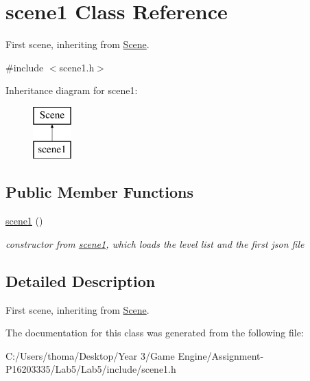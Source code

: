 \hypertarget{classscene1}{}\section{scene1 Class Reference}
\label{classscene1}


First scene, inheriting from \mbox{\hyperlink{class_scene}{Scene}}.  




{\ttfamily \#include $<$scene1.\+h$>$}

Inheritance diagram for scene1\+:\begin{figure}[H]
\begin{center}
\leavevmode
\includegraphics[height=2.000000cm]{classscene1}
\end{center}
\end{figure}
\subsection*{Public Member Functions}
\begin{DoxyCompactItemize}
\item 
\mbox{\label{classscene1_ad54bb3a6147888de62e2880df0d49c04}} 
\mbox{\hyperlink{classscene1_ad54bb3a6147888de62e2880df0d49c04}{scene1}} ()
\begin{DoxyCompactList}\small\item\em constructor from \mbox{\hyperlink{classscene1}{scene1}}, which loads the level list and the first json file \end{DoxyCompactList}\end{DoxyCompactItemize}


\subsection{Detailed Description}
First scene, inheriting from \mbox{\hyperlink{class_scene}{Scene}}. 

The documentation for this class was generated from the following file\+:\begin{DoxyCompactItemize}
\item 
C\+:/\+Users/thoma/\+Desktop/\+Year 3/\+Game Engine/\+Assignment-\/\+P16203335/\+Lab5/\+Lab5/include/scene1.\+h\end{DoxyCompactItemize}
